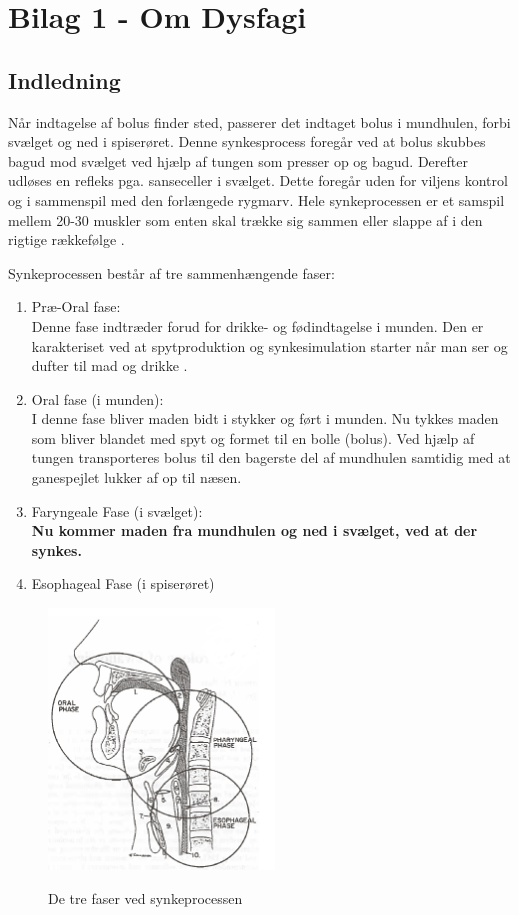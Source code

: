 \documentclass[main.tex]{subfiles}
\begin{document}
\chapter*{Bilag 1 - Om Dysfagi}
\label{Bilag1}
\section*{Indledning}
Når indtagelse af bolus finder sted, passerer det indtaget bolus i mundhulen, forbi svælget og ned i spiserøret. Denne synkesprocess foregår ved at bolus skubbes bagud mod svælget ved hjælp af tungen som presser op og bagud. Derefter udløses en refleks pga. sanseceller i svælget. Dette foregår uden for viljens kontrol og i sammenspil med den forlængede rygmarv. Hele synkeprocessen er et samspil mellem 20-30 muskler som enten skal trække sig sammen eller slappe af i den rigtige rækkefølge \cite{Sand2008MennesketsFysiologi}. 

Synkeprocessen består af tre sammenhængende faser:
\begin{enumerate}
\item Præ-Oral fase:\\
Denne fase indtræder forud for drikke- og fødindtagelse i munden. Den er karakteriset ved at spytproduktion og synkesimulation starter når man ser og dufter til mad og drikke \cite [s. 12]{Kjaersgaard2013DifficultiesPerspective}.    
\item Oral fase (i munden): \\
I denne fase bliver maden bidt i stykker og ført i munden. Nu tykkes maden som bliver blandet med spyt og formet til en bolle (bolus). Ved hjælp af tungen transporteres bolus til den bagerste del af mundhulen samtidig med at ganespejlet lukker af op til næsen.
\item Faryngeale Fase (i svælget): \\
\textbf{Nu kommer maden fra mundhulen og ned i svælget, ved at der synkes.} 
\item Esophageal Fase (i spiserøret)\cite{Bass1992Dysphagia:Management}
\end{enumerate}

\begin{figure}[H]
\centering
{\includegraphics[width=6cm]
{Figure/dysfagi3faser}}
\caption{De tre faser ved synkeprocessen\cite{Bass1992Dysphagia:Management}}
\label{trefaser}
\end{figure}
\end{document}
